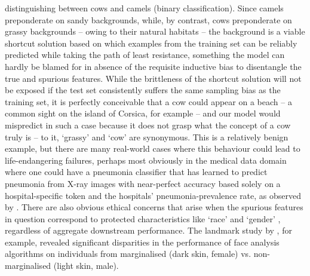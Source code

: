 distinguishing between cows and camels (binary classification). 
%
Since camels preponderate on sandy backgrounds, while, by contrast, cows preponderate on grassy
backgrounds -- owing to their natural habitats -- the background is a viable shortcut solution
based on which examples from the training set can be reliably predicted while taking the path of
least resistance, something the model can hardly be blamed for in absence of the requisite
inductive bias to disentangle the true and spurious features.
%
While the brittleness of the shortcut solution will not be exposed if the test set consistently
suffers the same sampling bias as the training set, it is perfectly conceivable that a cow could
appear on a beach -- a common sight on the island of Corsica, for example -- and our model would
mispredict in such a case because it does not grasp what the concept of a cow truly is -- to it,
`grassy' and `cow' are synonymous.
%
This is a relatively benign example, but there are many real-world cases where this behaviour could
lead to life-endangering failures, perhaps most obviously in the medical data domain where one
could have a pneumonia classifier that has learned to predict pneumonia from X-ray images with
near-perfect accuracy based solely on a hospital-specific token and the hospitals'
pneumonia-prevalence rate, as observed by \cite{zech2018variable}.
%
There are also obvious ethical concerns that arise when the spurious features in question
correspond to protected characteristics like `race' and `gender' \citep{buolamwini2018gender,
wang2019balanced}, regardless of aggregate downstream performance. 
%
The landmark study by \cite{buolamwini2018gender}, for example, revealed significant disparities in
the performance of face analysis algorithms on individuals from marginalised (dark skin, female)
vs. non-marginalised (light skin, male).

